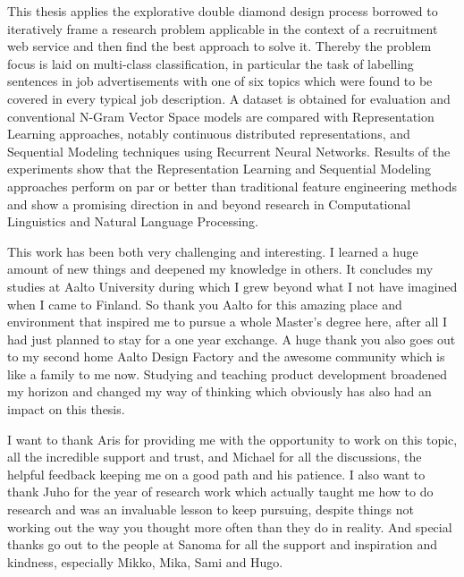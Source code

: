 \begin{abstractpage}[english]

This thesis applies the explorative double diamond design process borrowed to iteratively frame a research problem applicable in the context of a recruitment web service and then find the best approach to solve it. Thereby the problem focus is laid on multi-class classification, in particular the task of labelling sentences in job advertisements with one of six topics which were found to be covered in every typical job description. A dataset is obtained for evaluation and conventional N-Gram Vector Space models are compared with Representation Learning approaches, notably continuous distributed representations, and Sequential Modeling techniques using Recurrent Neural Networks. Results of the experiments show that the Representation Learning and Sequential Modeling approaches perform on par or better than traditional feature engineering methods and show a promising direction in and beyond research in Computational Linguistics and Natural Language Processing.

\end{abstractpage}

\newpage



This work has been both very challenging and interesting. I learned a huge amount of new things and deepened my knowledge in others. It concludes my studies at Aalto University during which I grew beyond what I not have imagined when I came to Finland. So thank you Aalto for this amazing place and environment that inspired me to pursue a whole Master's degree here, after all I had just planned to stay for a one year exchange. A huge thank you also goes out to my second home Aalto Design Factory and the awesome community which is like a family to me now. Studying and teaching product development broadened my horizon and changed my way of thinking which obviously has also had an impact on this thesis.

I want to thank Aris for providing me with the opportunity to work on this topic, all the incredible support and trust, and Michael for all the discussions, the helpful feedback keeping me on a good path and his patience. I also want to thank Juho for the year of research work which actually taught me how to do research and was an invaluable lesson to keep pursuing, despite things not working out the way you thought more often than they do in reality.  And special thanks go out to the people at Sanoma for all the support and inspiration and kindness, especially Mikko, Mika, Sami and Hugo.

